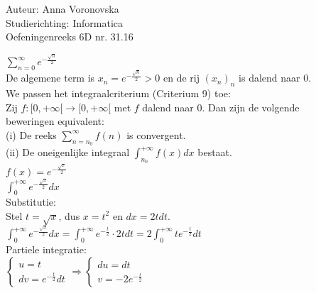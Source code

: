 \documentclass[a4paper]{article}
\begin{document}
  
\noindent \large Auteur: Anna Voronovska \\
\noindent \large Studierichting: Informatica\\
\noindent \large Oefeningenreeks 6D nr. 31.16\\

\medskip

\normalsize

$\displaystyle\sum_{n=0}^{\infty} e^{-\tfrac{\sqrt{n}}{2}}$\\

De algemene term is $x_n = e^{-\tfrac{\sqrt{n}}{2}} > 0$ en de rij $(x_n)_n$ is dalend naar $0$.\\

We passen het integraalcriterium (Criterium 9) toe:\\

Zij $f:[0,+\infty[\to[0,+\infty[$ met $f$ dalend naar $0$. Dan zijn de volgende\\

beweringen equivalent:\\

(i) De reeks $\displaystyle\sum_{n=n_0}^{\infty} f(n)$ is convergent.\\

(ii) De oneigenlijke integraal $\displaystyle\int_{n_0}^{+\infty} f(x)dx$ bestaat.\\

$f(x) = e^{-\tfrac{\sqrt{x}}{2}}$\\

$\displaystyle\int_0^{+\infty} e^{-\tfrac{\sqrt{x}}{2}}dx$\\

Substitutie:\\

Stel $t = \sqrt{x}$, dus $x = t^2$ en $dx = 2tdt$.\\

$\displaystyle\int_0^{+\infty} e^{-\tfrac{\sqrt{x}}{2}}dx
  = \displaystyle\int_0^{+\infty} e^{-\tfrac{t}{2}} \cdot 2tdt
  = 2\displaystyle\int_0^{+\infty} te^{-\tfrac{t}{2}}dt$\\

Partiele integratie:\\ 

$\left\{ \begin{array}{l} 
    u = t \\ 
    dv = e^{-\tfrac{t}{2}}  dt 
\end{array} \right.
\Rightarrow
\left\{ \begin{array}{l} 
    du = dt \\ 
    v = -2e^{-\tfrac{t}{2}} 
\end{array} \right.$\\
\end{document}
